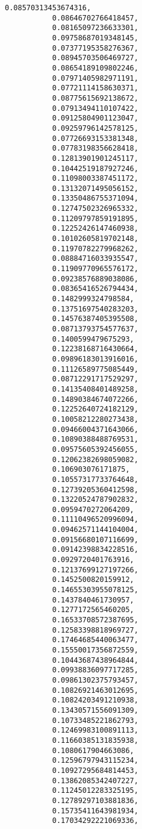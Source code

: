 \documentclass[11pt]{article}
\begin{document}
\begin{Verbatim}[commandchars=\\\{\}]
           0.08570313453674316,
           0.08646702766418457,
           0.08165097236633301,
           0.09758687019348145,
           0.07377195358276367,
           0.08945703506469727,
           0.08654189109802246,
           0.07971405982971191,
           0.07721114158630371,
           0.08775615692138672,
           0.07913494110107422,
           0.09125804901123047,
           0.09259796142578125,
           0.07726693153381348,
           0.07783198356628418,
           0.12813901901245117,
           0.10442519187927246,
           0.11098003387451172,
           0.13132071495056152,
           0.13350486755371094,
           0.12747502326965332,
           0.11209797859191895,
           0.12252426147460938,
           0.10102605819702148,
           0.11970782279968262,
           0.08884716033935547,
           0.11909770965576172,
           0.09238576889038086,
           0.08365416526794434,
           0.1482999324798584,
           0.13751697540283203,
           0.14576387405395508,
           0.08713793754577637,
           0.1400599479675293,
           0.12238168716430664,
           0.09896183013916016,
           0.11126589775085449,
           0.08712291717529297,
           0.14135408401489258,
           0.14890384674072266,
           0.12252640724182129,
           0.10058212280273438,
           0.09466004371643066,
           0.10890388488769531,
           0.09575605392456055,
           0.12062382698059082,
           0.106903076171875,
           0.10557317733764648,
           0.12739205360412598,
           0.13220524787902832,
           0.0959470272064209,
           0.11110496520996094,
           0.09462571144104004,
           0.09156680107116699,
           0.09142398834228516,
           0.0929720401763916,
           0.12137699127197266,
           0.1452500820159912,
           0.14655303955078125,
           0.1437840461730957,
           0.1277172565460205,
           0.16533708572387695,
           0.12583398818969727,
           0.17464685440063477,
           0.15550017356872559,
           0.10443687438964844,
           0.09938836097717285,
           0.09861302375793457,
           0.10826921463012695,
           0.10824203491210938,
           0.13430571556091309,
           0.10733485221862793,
           0.12469983100891113,
           0.11660385131835938,
           0.1080617904663086,
           0.12596797943115234,
           0.10927295684814453,
           0.13862085342407227,
           0.11245012283325195,
           0.12789297103881836,
           0.15735411643981934,
           0.17034292221069336,

\end{Verbatim}
\end{document}
